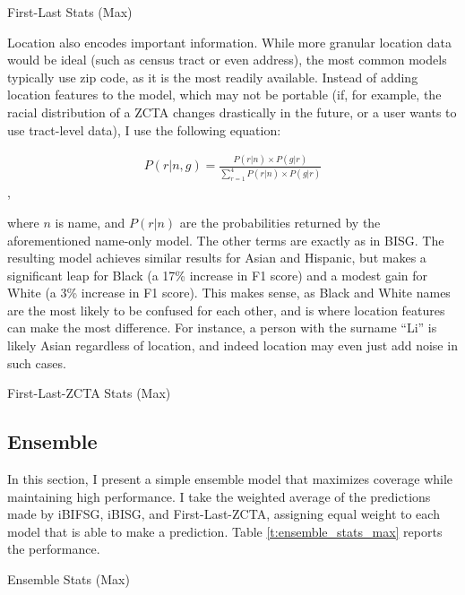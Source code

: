 \documentclass[12pt]{article}
\begin{document}
\begin{table}[H]
    \caption{First-Last Stats (Max)}
    \label{t:fl_stats_max}
    \centering
    
\end{table}

Location also encodes important information. While more granular location data would be ideal (such as census tract or even address), the most common models typically use zip code, as it is the most readily available. Instead of adding location features to the model, which may not be portable (if, for example, the racial distribution of a ZCTA changes drastically in the future, or a user wants to use tract-level data), I use the following equation:

\begin{align*}
    P(r | n, g) = \frac{P(r | n) \times P(g | r)}{\sum_{r=1}^{4} P(r | n) \times P(g | r)}
\end{align*},

where \( n \) is name, and \( P(r | n) \) are the probabilities returned by the aforementioned name-only model. The other terms are exactly as in BISG. The resulting model achieves similar results for Asian and Hispanic, but makes a significant leap for Black (a 17\% increase in F1 score) and a modest gain for White (a 3\% increase in F1 score). This makes sense, as Black and White names are the most likely to be confused for each other, and is where location features can make the most difference. For instance, a person with the surname ``Li'' is likely Asian regardless of location, and indeed location may even just add noise in such cases.

\begin{table}[H]
    \caption{First-Last-ZCTA Stats (Max)}
    \label{t:flz_bayes_stats_max}
    \centering
    
\end{table}

\subsection{Ensemble}

In this section, I present a simple ensemble model that maximizes coverage while maintaining high performance. I take the weighted average of the predictions made by iBIFSG, iBISG, and First-Last-ZCTA, assigning equal weight to each model that is able to make a prediction. Table \ref{t:ensemble_stats_max} reports the performance.

\begin{table}[H]
    \caption{Ensemble Stats (Max)}
    \label{t:ensemble_stats_max}
    \centering
    
\end{table}
\end{document}
